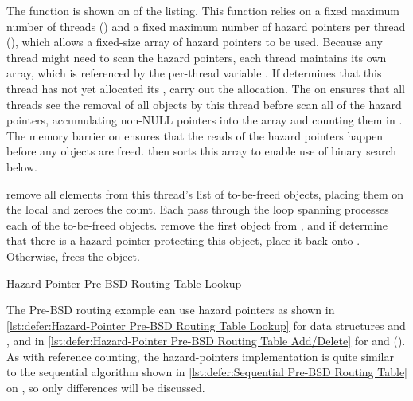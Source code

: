 \begin{fcvref}
The  function is shown on 
of the listing.
This function relies on a fixed maximum number of threads ()
and a fixed maximum number of hazard pointers per thread (),
which allows a fixed-size array of hazard pointers to be used.
Because any thread might need to scan the hazard pointers, each thread
maintains its own array, which is referenced by the per-thread variable
.
If  determines that this thread has not yet allocated its
,  carry out the allocation.
The  on  ensures that all threads see the
removal of all objects by this thread before
 scan
all of the hazard pointers, accumulating non-NULL pointers into
the  array and counting them in .
The memory barrier on  ensures that the reads of
the hazard pointers
happen before any objects are freed.
 then sorts this array to enable use of binary search below.

remove all elements from this thread's list of
to-be-freed objects, placing them on the local 
and  zeroes the count.
Each pass through the loop spanning
 processes each
of the to-be-freed objects.
remove the first object from ,
and if 
determine that there is a hazard pointer
protecting this object, 
place it back onto .
Otherwise,  frees the object.
\end{fcvref}

\begin{listing}

\caption{Hazard-Pointer Pre-BSD Routing Table Lookup}
\label{lst:defer:Hazard-Pointer Pre-BSD Routing Table Lookup}
\end{listing}

The Pre-BSD routing example can use hazard pointers as shown in
\cref{lst:defer:Hazard-Pointer Pre-BSD Routing Table Lookup}
for data structures and , and in
\cref{lst:defer:Hazard-Pointer Pre-BSD Routing Table Add/Delete}
for  and 
().
As with reference counting, the hazard-pointers implementation
is quite similar to the sequential algorithm shown in
\cref{lst:defer:Sequential Pre-BSD Routing Table}
on
,
so only differences will be discussed.

